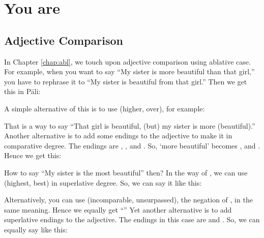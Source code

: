 \chapter{You are }\label{chap:adjcomp}

{}
\section*{Adjective Comparison}

In Chapter \ref{chap:abl}, we touch upon adjective comparison using ablative case. For example, when you want to say ``My sister is more beautiful than that girl,'' you have to rephrase it to ``My sister is beautiful from that girl.'' Then we get this in P\=ali:


A simple alternative of this is to use  (higher, over), for example:


That is a way to say ``That girl is beautiful, (but) my sister is more (beautiful).'' Another alternative is to add some endings to the adjective to make it in comparative degree. The endings are , , and . So, `more beautiful' becomes ,  and . Hence we get this:


How to say ``My sister is the most beautiful'' then? In the way of , we can use  (highest, best) in superlative degree. So, we can say it like this:


Alternatively, you can use  (incomparable, unsurpassed), the negation of , in the same meaning. Hence we equally get ``'' Yet another alternative is to add superlative endings to the adjective. The endings in this case are  and . So, we can equally say like this:


